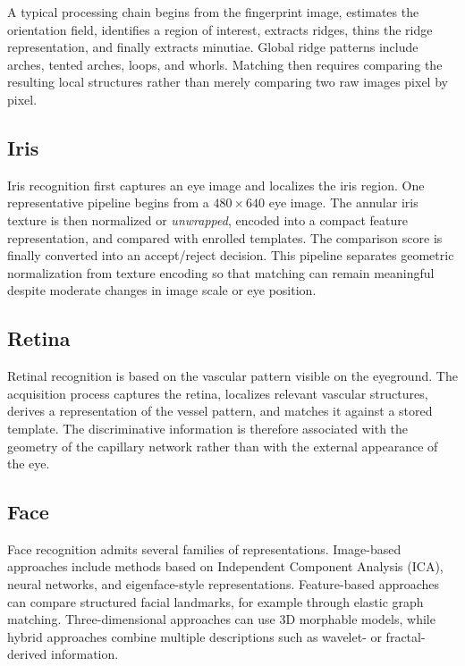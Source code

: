 \documentclass[11pt,a4paper,oneside]{report}
\begin{document}
A typical processing chain begins from the fingerprint image, estimates the
orientation field, identifies a region of interest, extracts ridges, thins
the ridge representation, and finally extracts minutiae. Global ridge
patterns include arches, tented arches, loops, and whorls. Matching then
requires comparing the resulting local structures rather than merely
comparing two raw images pixel by pixel.

\subsection{Iris}

Iris recognition first captures an eye image and localizes the iris region.
One representative pipeline begins from a \(480\times640\) eye image. The
annular iris texture is then normalized or \emph{unwrapped}, encoded into a
compact feature representation, and compared with enrolled templates.
The comparison score is finally converted into an accept/reject decision.
This pipeline separates geometric normalization from texture encoding so that
matching can remain meaningful despite moderate changes in image scale or eye
position.

\subsection{Retina}

Retinal recognition is based on the vascular pattern visible on the
eyeground. The acquisition process captures the retina, localizes relevant
vascular structures, derives a representation of the vessel pattern, and
matches it against a stored template. The discriminative information is
therefore associated with the geometry of the capillary network rather than
with the external appearance of the eye.

\subsection{Face}

Face recognition admits several families of representations. Image-based
approaches include methods based on Independent Component Analysis (ICA),
neural networks, and eigenface-style representations. Feature-based
approaches can compare structured facial landmarks, for example through
elastic graph matching. Three-dimensional approaches can use 3D morphable
models, while hybrid approaches combine multiple descriptions such as
wavelet- or fractal-derived information.
\end{document}
